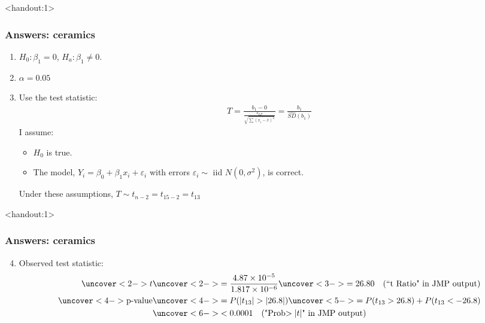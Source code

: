 \documentclass[handout]{beamer}\usepackage[]{graphicx}\usepackage[]{color}
\newcommand{\answers}{1}
\providecommand{\e}{\varepsilon}
\providecommand{\ov}[1]{\overline{#1}}
\providecommand{\wh}[1]{\widehat{#1}}
\numberwithin{equation}{section}
\begin{document}
\begin{frame}<handout:\answers>
\frametitle{Answers: ceramics} \small
\begin{enumerate}[1. ]
\item $H_0: \beta_1 = 0$, $H_a: \beta_1 \ne 0$.
\pause \item $\alpha = 0.05$
\pause \item Use the test statistic:
\pause \begin{align*}
T = \frac{b_1 - 0}{\frac{s_{LF}}{\sqrt{\sum(x_i - \ov{x})^2}}} = \frac{b_1}{\wh{SD}(b_1)}
\end{align*}
\pause I assume:
\begin{itemize}
\pause \item $H_0$ is true.
\pause \item The model, $Y_i = \beta_0 + \beta_1 x_i + \e_i$ with errors $\e_i \sim$ iid $N(0, \sigma^2)$, is correct.  
\end{itemize}
Under these assumptions, $T \sim t_{n - 2} = t_{15 - 2} = t_{13}$
\end{enumerate}
\end{frame}


\begin{frame}<handout:\answers>
\frametitle{Answers: ceramics} \small
\begin{enumerate}
\setcounter{enumi}{3}
\item  Observed test statistic:
\begin{align*}
\uncover<2->{t} & \uncover<2->{= \frac{4.87 \times 10^{-5}}{1.817 \times 10^{-6}}} \uncover<3->{= 26.80 \quad \text{(``t Ratio" in JMP output)}} \\
\uncover<4->{\text{p-value}} & \uncover<4->{= P(|t_{13}| > |26.8|)} \uncover<5->{ = P(t_{13} > 26.8) + P(t_{13} < - 26.8)} \\
&\uncover<6->{< 0.0001 \quad (\text{"Prob$>|t|$" in JMP output})}
\end{align*}
\end{enumerate}
\end{frame}
\end{document}
